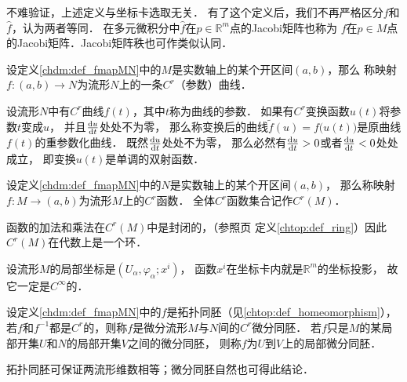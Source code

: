 
\begin{remark}\label{chdm:rek_jacobi}
    不难验证，上述定义与坐标卡选取无关．
    有了这个定义后，我们不再严格区分$f$和$\hat{f}$，认为两者等同．
    在多元微积分中$\hat{f}$在$p\in \mathbb{R}^m$点的Jacobi矩阵也称为
    $f$在$p\in M$点的Jacobi矩阵．Jacobi矩阵秩也可作类似认同．
\end{remark}
\begin{definition}\label{chdm:def_fmapCurve}
    设定义\ref{chdm:def_fmapMN}中的$M$是实数轴上的某个开区间$(a,b)$，那么
    称映射$f:(a,b)\to N$为流形$N$上的一条$C^r${\heiti （参数）曲线}． 
\end{definition}
设流形$N$中有$C^r$曲线$f(t)$，其中$t$称为曲线的{\heiti 参数}．
如果有$C^r$变换函数$u(t)$将参数$t$变成$u$，
并且$\frac{{\rm d} u }{{\rm d} t}$处处不为零，
那么称变换后的曲线$\tilde{f}(u)=f\bigl(u(t)\bigr)$是原曲线$f(t)$的{\heiti 重参数化曲线}．
既然$\frac{{\rm d} u }{{\rm d} t}$处处不为零，
那么必然有$\frac{{\rm d} u }{{\rm d} t}>0$或者$\frac{{\rm d} u }{{\rm d} t}<0$处处成立，
即变换$u(t)$是单调的双射函数．

\begin{definition}\label{chdm:def_func}
    设定义\ref{chdm:def_fmapMN}中的$N$是实数轴上的某个开区间$(a,b)$，
    那么称映射$f:M \to (a,b)$为流形$M$上的$C^r${\heiti 函数}．
    全体$C^r$函数集合记作$C^r(M)$．
\end{definition}
函数的加法和乘法在$C^r(M)$中是封闭的，（参照\pageref{chtop:def_ring}页
定义\ref{chtop:def_ring}）因此$C^r(M)$在代数上是一个{\kaishu 环}．


 

\begin{example}
    设流形$M$的局部坐标是$(U_\alpha,\varphi_\alpha;x^i)$，
    函数$x^i$在坐标卡内就是$\mathbb{R}^m$的坐标投影，
    故它一定是$C^\infty$的．
\end{example}

\begin{definition}\label{chdm:def_Diff-Homeomorphism}
    设定义\ref{chdm:def_fmapMN}中的$f$是拓扑同胚（见\ref{chtop:def_homeomorphism}），
    若$f$和$f^{-1}$都是$C^r$的，则称$f$是微分流形$M$与$N$间的$C^r${\heiti 微分同胚}．
    若$f$只是$M$的某局部开集$U$和$N$的局部开集$V$之间的微分同胚，
    则称$f$为$U$到$V$上的{\heiti 局部微分同胚}．
\end{definition}

拓扑同胚可保证两流形维数相等；微分同胚自然也可得此结论．

